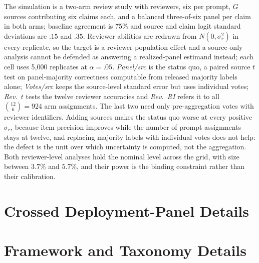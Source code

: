 \documentclass[11pt]{article}
\begin{document}
The simulation is a two-arm review study with \SimReviewers{} reviewers, six per
prompt, $G$ sources contributing six claims each, and a balanced three-of-six
panel per claim in both arms; baseline agreement is 75\% and source and claim
logit standard deviations are $.15$ and $.35$. Reviewer abilities are redrawn
from $N(0,\sigma_r^2)$ in every replicate, so the target is a
reviewer-population effect and a source-only analysis cannot be defended as
answering a realized-panel estimand instead; each cell uses 5{,}000 replicates
at $\alpha=.05$. \emph{Panel/src} is the status quo, a paired source $t$ test on
panel-majority correctness computable from released majority labels alone;
\emph{Votes/src} keeps the source-level standard error but uses individual
votes; \emph{Rev.\ $t$} tests the twelve reviewer accuracies and \emph{Rev.\ RI}
refers it to all $\binom{12}{6}=924$ arm assignments. The last two need only
pre-aggregation votes with reviewer identifiers. Adding sources makes the status
quo worse at every positive $\sigma_r$, because item precision improves while
the number of prompt assignments stays at twelve, and replacing majority labels
with individual votes does not help: the defect is the unit over which
uncertainty is computed, not the aggregation. Both reviewer-level analyses hold
the nominal level across the grid, with size between $3.7\%$ and $5.7\%$, and
their power is the binding constraint rather than their calibration.










\FloatBarrier
\section{Crossed Deployment-Panel Details}
\label{sec:appendix-cmj}



\FloatBarrier
\section{Framework and Taxonomy Details}






\end{document}
